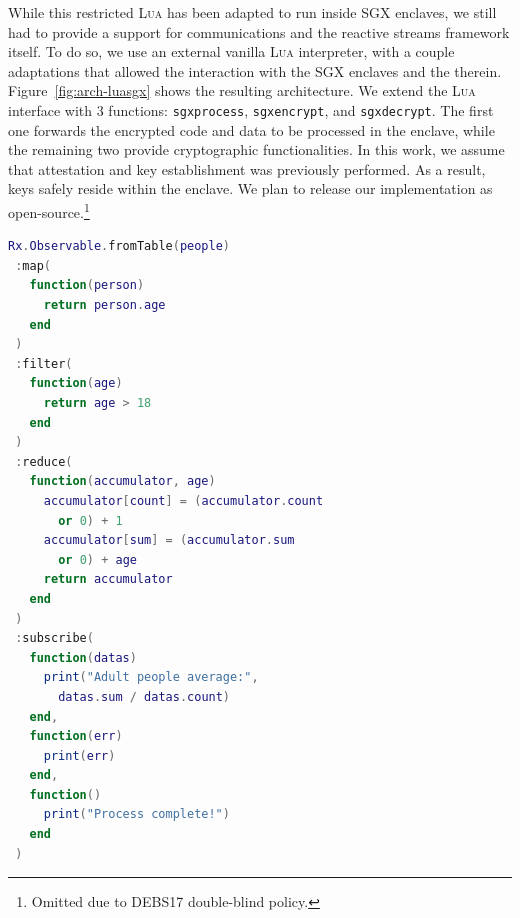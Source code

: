 While this restricted \textsc{Lua} has been adapted to run inside SGX enclaves, we still had to provide a support for communications and the reactive streams framework itself.
To do so, we use an external vanilla \textsc{Lua} interpreter, with a couple adaptations that allowed the interaction with the SGX enclaves and the \luavm therein.
Figure~\ref{fig:arch-luasgx} shows the resulting architecture.
We extend the \textsc{Lua} interface with 3 functions: \texttt{sgxprocess}, \texttt{sgxencrypt}, and \texttt{sgxdecrypt}.
The first one forwards the encrypted code and data to be processed in the enclave, while the remaining two provide cryptographic functionalities.
In this work, we assume that attestation and key establishment was previously performed.
As a result, keys safely reside within the enclave.
We plan to release our implementation as open-source.\footnote{Omitted due to DEBS17 double-blind policy.}

\newpage

\begin{minipage}{\linewidth}
\begin{lstlisting}[language=LUA,caption={Example of process pipeline with RxLua.},label=pipeline-example]
Rx.Observable.fromTable(people)
 :map(
   function(person)
     return person.age
   end
 )
 :filter(
   function(age)
     return age > 18
   end
 )
 :reduce(
   function(accumulator, age)
     accumulator[count] = (accumulator.count
       or 0) + 1
     accumulator[sum] = (accumulator.sum
       or 0) + age
     return accumulator
   end
 )
 :subscribe(
   function(datas)
     print("Adult people average:",
       datas.sum / datas.count)
   end,
   function(err)
     print(err)
   end,
   function()
     print("Process complete!")
   end
 )
\end{lstlisting}
\end{minipage}
